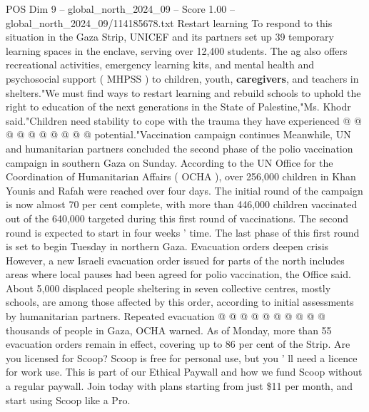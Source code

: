 \begin{textsample}{POS Dim 9 – global\_north\_2024\_09 – Score 1.00 – global\_north\_2024\_09/114185678.txt}
Restart learning To respond to this situation in the Gaza Strip, UNICEF and its partners set up 39 temporary learning spaces in the enclave, serving over 12,400 students.
The ag also offers recreational activities, emergency learning kits, and mental health and psychosocial support ( MHPSS ) to children, youth, \textbf{caregivers}, and teachers in shelters."We must find ways to restart learning and rebuild schools to uphold the right to education of the next generations in the State of Palestine,"Ms.
Khodr said."Children need stability to cope with the trauma they have experienced @ @ @ @ @ @ @ @ @ @ potential."Vaccination campaign continues Meanwhile, UN and humanitarian partners concluded the second phase of the polio vaccination campaign in southern Gaza on Sunday.
According to the UN Office for the Coordination of Humanitarian Affairs ( OCHA ), over 256,000 children in Khan Younis and Rafah were reached over four days.
The initial round of the campaign is now almost 70 per cent complete, with more than 446,000 children vaccinated out of the 640,000 targeted during this first round of vaccinations.
The second round is expected to start in four weeks ' time.
The last phase of this first round is set to begin Tuesday in northern Gaza.
Evacuation orders deepen crisis However, a new Israeli evacuation order issued for parts of the north includes areas where local pauses had been agreed for polio vaccination, the Office said.
About 5,000 displaced people sheltering in seven collective centres, mostly schools, are among those affected by this order, according to initial assessments by humanitarian partners.
Repeated evacuation @ @ @ @ @ @ @ @ @ @ thousands of people in Gaza, OCHA warned.
As of Monday, more than 55 evacuation orders remain in effect, covering up to 86 per cent of the Strip.
Are you licensed for Scoop?
Scoop is free for personal use, but you ' ll need a licence for work use.
This is part of our Ethical Paywall and how we fund Scoop without a regular paywall.
Join today with plans starting from just \$11 per month, and start using Scoop like a Pro.

\end{textsample}
